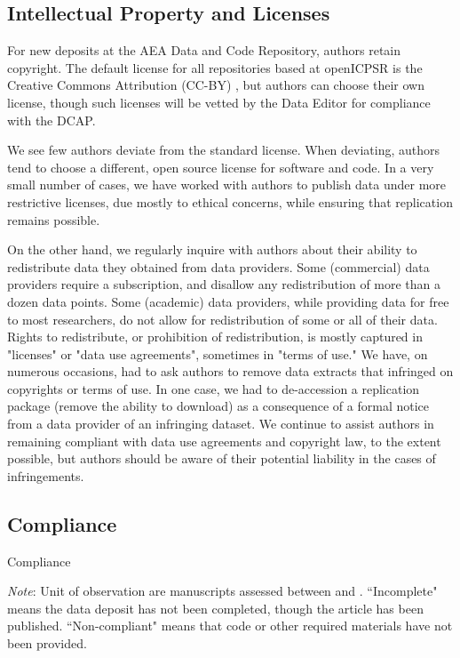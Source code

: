 \documentclass[PP]{AEA}
\newcommand{\aeadcr}{AEA Data and Code Repository}
\begin{document}
\subsection{Intellectual Property and Licenses} 
\label{sec:ip}

For new deposits at the \aeadcr{}, authors retain  copyright. The default license for all repositories based at openICPSR is the  Creative Commons Attribution (CC-BY) \citep{CreativeCommons2017}, but authors can choose their own license,  though such licenses will be vetted by the Data Editor for compliance with the \ac{DCAP}. 

We see few authors deviate from the standard license. When deviating, authors tend to choose a different, open source license \citep{OpenSourceInitiative2018} for software and code. In a very small number of cases, we have worked with authors to publish data under more restrictive licenses, due mostly to ethical concerns, while ensuring that replication remains possible.

On the other hand, we regularly inquire with authors about their ability to redistribute data they obtained from data providers. Some (commercial) data providers require a subscription, and disallow any redistribution of more than a dozen data points. Some (academic) data providers, while providing data for free to most researchers, do not allow for redistribution of some or all of their data. Rights to redistribute, or prohibition of redistribution, is mostly captured in "licenses" or "data use agreements", sometimes in "terms of use." We have, on numerous occasions, had to ask authors to remove data extracts that infringed on copyrights or terms of use. In one case, we had to de-accession a replication package (remove the ability to download) as a consequence of a formal notice from a data provider of an infringing dataset. We continue to assist authors in remaining compliant with data use agreements and copyright law, to the extent possible, but authors should be aware of their potential liability in the cases of infringements. 


\subsection{Compliance}
\label{sec:compliance}

\begin{table}[t]
    \centering
    \caption{Compliance}
    \label{tab:compliance}
    \begin{threeparttable}
    

    \begin{tablenotes}
    \footnotesize
    \item[] \textit{Note}: Unit of observation are manuscripts assessed between \firstday{} and \lastday{}. ``Incomplete" means the data deposit has not been completed, though the article has been published. ``Non-compliant" means that code or other required materials have not been provided.
    \end{tablenotes}
    \end{threeparttable}
\end{table}
\end{document}
